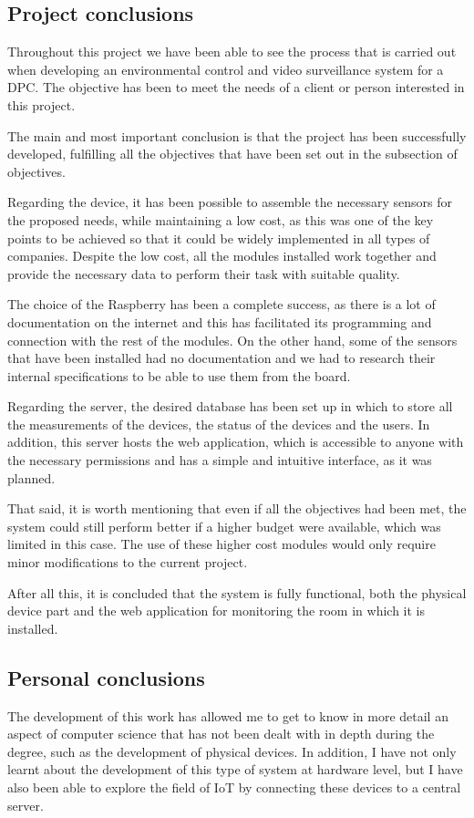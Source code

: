 \subsection{Project conclusions}\label{subsec:project-conclusions}
Throughout this project we have been able to see the process that is carried out when developing an environmental control and video surveillance system for a DPC. The objective has been to meet the needs of a client or person interested in this project.

The main and most important conclusion is that the project has been successfully developed, fulfilling all the objectives that have been set out in the subsection of objectives.

Regarding the device, it has been possible to assemble the necessary sensors for the proposed needs, while maintaining a low cost, as this was one of the key points to be achieved so that it could be widely implemented in all types of companies. Despite the low cost, all the modules installed work together and provide the necessary data to perform their task with suitable quality.

The choice of the Raspberry has been a complete success, as there is a lot of documentation on the internet and this has facilitated its programming and connection with the rest of the modules. On the other hand, some of the sensors that have been installed had no documentation and we had to research their internal specifications to be able to use them from the board.

Regarding the server, the desired database has been set up in which to store all the measurements of the devices, the status of the devices and the users. In addition, this server hosts the web application, which is accessible to anyone with the necessary permissions and has a simple and intuitive interface, as it was planned.

That said, it is worth mentioning that even if all the objectives had been met, the system could still perform better if a higher budget were available, which was limited in this case. The use of these higher cost modules would only require minor modifications to the current project.

After all this, it is concluded that the system is fully functional, both the physical device part and the web application for monitoring the room in which it is installed.

\subsection{Personal conclusions}\label{subsec:personal-conclusions}
The development of this work has allowed me to get to know in more detail an aspect of computer science that has not been dealt with in depth during the degree, such as the development of physical devices. In addition, I have not only learnt about the development of this type of system at hardware level, but I have also been able to explore the field of IoT by connecting these devices to a central server.

